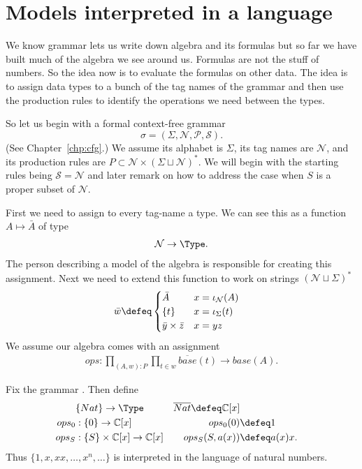 \section{Models interpreted in a language}
We know grammar lets us write down algebra and its formulas but so 
far we have built much of the algebra we see around us.  Formulas 
are not the stuff of numbers.  So the idea now is to evaluate the 
formulas on other data. The idea is to assign data types to a 
bunch of the tag names of the grammar and then use the production 
rules to identify the operations we need between the types.

So let us begin with a formal context-free grammar 
\[ 
    \sigma=(\Sigma,\mathcal{N},\mathcal{P},\mathcal{S}).
\] 
(See Chapter~\ref{chp:cfg}.)
We assume its alphabet is $\Sigma$, its tag names are $\mathcal{N}$, 
and its production rules are $P\subset \mathcal{N}\times (\Sigma\sqcup \mathcal{N})^*$.
We will begin with the starting rules being $\mathcal{S}=\mathcal{N}$ and later remark on 
how to address the case when $S$ is a proper subset of $\mathcal{N}$.

First we need to assign to every tag-name a type.  We can see this 
as a function $A\mapsto \bar{A}$ of type
\begin{align*}
    \mathcal{N}\to \Type.
\end{align*}
The person describing a model of the algebra is responsible for 
creating this assignment.  Next we need to extend this function 
to work on strings $(\mathcal{N}\sqcup \Sigma)^*$ 
\begin{align*}
    \bar{w} & \defeq \begin{cases}
        \bar{A} & x=\iota_{\mathcal{N}}(A)\\
        \{t\} & x=\iota_{\Sigma}(t)\\
        \bar{y}\times \bar{z} & x=yz
    \end{cases}
\end{align*}
We assume 
our algebra comes with an assignment
\begin{align*}
    ops:\prod_{(A,w):P}\prod_{t\in w}\overline{base}(t)\to base(A).
\end{align*}


\begin{example}
    Fix the grammar .
    Then define 
    \begin{align*}
        & \{Nat\}\to \Type & \overline{Nat} \defeq \mathbb{C}[x]\\
        ops_0 & : \{0\}\to \mathbb{C}[x] &  ops_0(0) & \defeq 1\\
        ops_S & : \{S\}\times \mathbb{C}[x]\to \mathbb{C}[x] &  ops_S(S,a(x)) & \defeq a(x)x.
    \end{align*}
    Thus $\{1,x,xx,\ldots, x^n,\ldots\}$ is interpreted in the language 
    of natural numbers.
\end{example}


